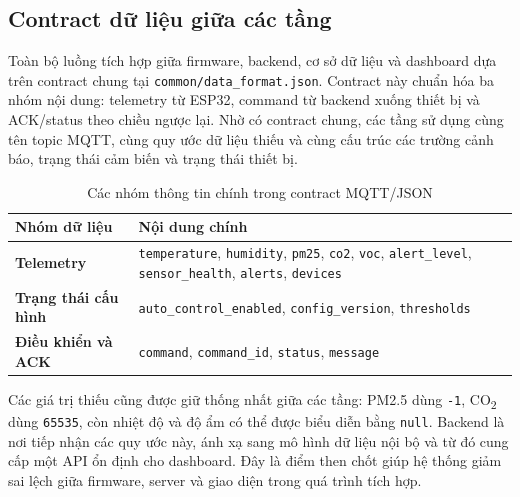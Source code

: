 \subsection{Contract dữ liệu giữa các tầng}

Toàn bộ luồng tích hợp giữa firmware, backend, cơ sở dữ liệu và dashboard dựa trên
contract chung tại \texttt{common/data\_format.json}. Contract này chuẩn hóa ba nhóm nội
dung: telemetry từ ESP32, command từ backend xuống thiết bị và ACK/status theo chiều
ngược lại. Nhờ có contract chung, các tầng sử dụng cùng tên topic MQTT, cùng quy ước dữ
liệu thiếu và cùng cấu trúc các trường cảnh báo, trạng thái cảm biến và trạng thái thiết
bị.

\begin{table}[H]
    \centering
    \caption{Các nhóm thông tin chính trong contract MQTT/JSON}
    \begin{tabularx}{\textwidth}{>{\bfseries}l X}
        \toprule
        Nhóm dữ liệu & Nội dung chính \\
        \midrule
        Telemetry & \texttt{temperature}, \texttt{humidity}, \texttt{pm25}, \texttt{co2}, \texttt{voc}, \texttt{alert\_level}, \texttt{sensor\_health}, \texttt{alerts}, \texttt{devices} \\
        Trạng thái cấu hình & \texttt{auto\_control\_enabled}, \texttt{config\_version}, \texttt{thresholds} \\
        Điều khiển và ACK & \texttt{command}, \texttt{command\_id}, \texttt{status}, \texttt{message} \\
        \bottomrule
    \end{tabularx}
\end{table}

Các giá trị thiếu cũng được giữ thống nhất giữa các tầng: PM2.5 dùng \texttt{-1},
CO\textsubscript{2} dùng \texttt{65535}, còn nhiệt độ và độ ẩm có thể được biểu diễn
bằng \texttt{null}. Backend là nơi tiếp nhận các quy ước này, ánh xạ sang mô hình dữ
liệu nội bộ và từ đó cung cấp một API ổn định cho dashboard. Đây là điểm then chốt giúp
hệ thống giảm sai lệch giữa firmware, server và giao diện trong quá trình tích hợp.
